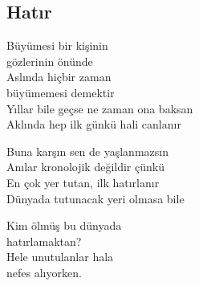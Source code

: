 \subsection{Hatır}

Büyümesi bir kişinin \\
	gözlerinin önünde \\
Aslında hiçbir zaman \\
	büyümemesi demektir \\
Yıllar bile geçse ne zaman ona baksan \\
Aklında hep ilk günkü hali canlanır

\noindent\newline
Buna karşın sen de yaşlanmazsın \\
Anılar kronolojik değildir çünkü \\
En çok yer tutan, ilk hatırlanır \\
Dünyada tutunacak yeri olmasa bile

\noindent\newline
Kim ölmüş bu dünyada \\
	hatırlamaktan? \\
Hele unutulanlar hala \\
	nefes alıyorken.